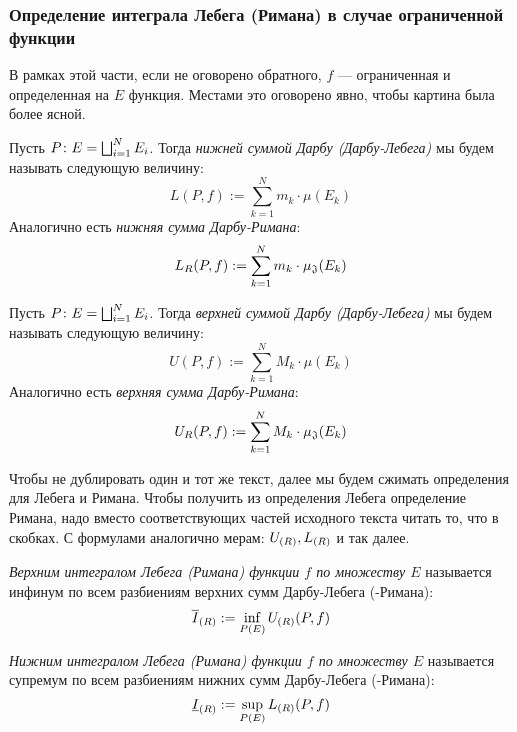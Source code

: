 \subsubsection*{Определение интеграла Лебега (Римана) в случае ограниченной функции}

\begin{note}
	В рамках этой части, если не оговорено обратного, $f$ --- ограниченная и определенная на $E$ функция. Местами это оговорено явно, чтобы картина была более ясной.
\end{note}

\begin{definition}
	Пусть $P \colon E = \bigsqcup_{i = 1}^N E_i$. Тогда \textit{нижней суммой Дарбу (Дарбу-Лебега)} мы будем называть следующую величину:
	\[
		L(P, f) := \sum_{k = 1}^N m_k \cdot \mu(E_k)
	\]
	Аналогично есть \textit{нижняя сумма Дарбу-Римана}:
	\[
		L_R(P, f) := \sum_{k = 1}^N m_k \cdot \operatorname{\mu_\mathfrak{J}}(E_k)
	\]
\end{definition}

\begin{definition}
	Пусть $P \colon E = \bigsqcup_{i = 1}^N E_i$. Тогда \textit{верхней суммой Дарбу (Дарбу-Лебега)} мы будем называть следующую величину:
	\[
	U(P, f) := \sum_{k = 1}^N M_k \cdot \mu(E_k)
	\]
	Аналогично есть \textit{верхняя сумма Дарбу-Римана}:
	\[
	U_R(P, f) := \sum_{k = 1}^N M_k \cdot \operatorname{\mu_\mathfrak{J}}(E_k)
	\]
\end{definition}

\begin{note}
	Чтобы не дублировать один и тот же текст, далее мы будем сжимать определения для Лебега и Римана. Чтобы получить из определения Лебега определение Римана, надо вместо соответствующих частей исходного текста читать то, что в скобках. С формулами аналогично мерам: $U_{(R)}, L_{(R)}$ и так далее.
\end{note}

\begin{definition}
	\textit{Верхним интегралом Лебега (Римана) функции $f$ по множеству $E$} называется инфинум по всем разбиениям верхних сумм Дарбу-Лебега (-Римана):
	\[
		\overline{I}_{(R)} := \inf_{P(E)} U_{(R)}(P, f)
	\]
\end{definition}

\begin{definition}
	\textit{Нижним интегралом Лебега (Римана) функции $f$ по множеству $E$} называется супремум по всем разбиениям нижних сумм Дарбу-Лебега (-Римана):
	\[
		\underline{I}_{(R)} := \sup_{P(E)} L_{(R)}(P, f)
	\]
\end{definition}

